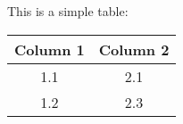 \documentclass{book}
\begin{document}
This is a simple table:

\begin{table}
\begin{tabular}{| c | c |}
\hline
Column 1

 & Column 2

\\
\hline
1.1

 & 2.1

\\
\hline
1.2

 & 2.3

\\
\hline
\hline
\end{tabular}
\end{table}
\end{document}
